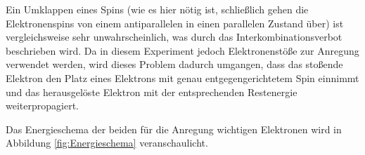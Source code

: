 Ein Umklappen eines Spins (wie es hier nötig ist, schließlich gehen die Elektronenspins von einem antiparallelen in einen 
parallelen Zustand über) ist vergleichsweise sehr unwahrscheinlich, was durch das Interkombinationsverbot beschrieben wird. 
Da in diesem Experiment jedoch Elektronenstöße zur Anregung verwendet werden, wird dieses Problem dadurch umgangen, dass 
das stoßende Elektron den Platz eines Elektrons mit genau entgegengerichtetem Spin einnimmt und das herausgelöste Elektron mit 
der entsprechenden Restenergie weiterpropagiert. 

Das Energieschema der beiden für die Anregung wichtigen Elektronen wird in Abbildung \ref{fig:Energieschema} veranschaulicht. 
